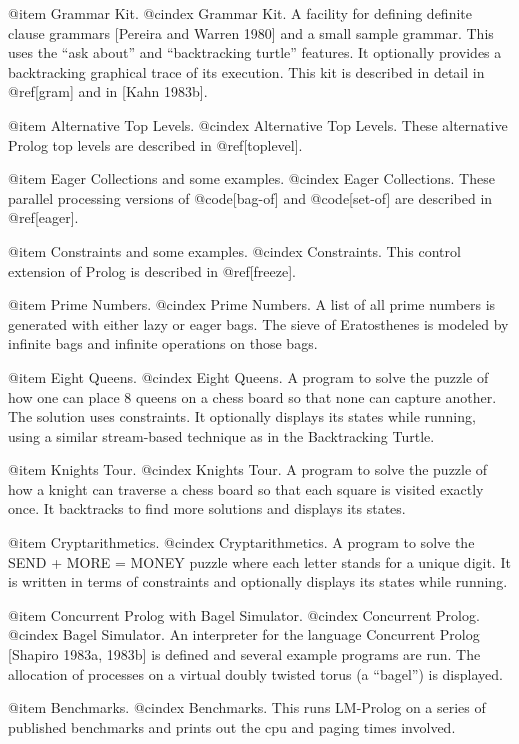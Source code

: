 {@item Grammar Kit.
@cindex Grammar Kit.
A facility for defining definite clause grammars 
[Pereira and Warren 1980]
and a small sample grammar.  This uses the ``ask about'' and
``backtracking turtle'' features.  It optionally provides a backtracking
graphical trace of its execution.  This kit is described in detail in
@ref[gram] and in [Kahn 1983b].

@item Alternative Top Levels.
@cindex Alternative Top Levels.
These alternative Prolog top levels are described in @ref[toplevel].

@item Eager Collections and some examples.
@cindex Eager Collections.
These parallel processing versions of 
@code[bag-of] and @code[set-of] are described in @ref[eager].

@item Constraints and some examples.
@cindex Constraints.
This control extension of Prolog is described 
in @ref[freeze].

@item Prime Numbers.
@cindex Prime Numbers.
A list of all prime numbers is generated with either
lazy or eager bags.  The sieve of Eratosthenes is modeled by infinite
bags and infinite operations on those bags.

@item Eight Queens.
@cindex Eight Queens.
A program to solve the puzzle of how one can place 8 queens on 
a chess board so that none can capture another. The solution uses constraints.
It optionally displays its states while running, using a similar stream-based
technique as in the Backtracking Turtle.

@item Knights Tour.
@cindex Knights Tour.
A program to solve the puzzle of how a knight can traverse a
chess board so that each square is visited exactly once.  It backtracks to
find more solutions and displays its states.

@item Cryptarithmetics.
@cindex Cryptarithmetics.
A program to solve the SEND + MORE = MONEY puzzle
where each letter stands for a unique digit.  It is written in terms of
constraints and optionally displays its states while running.

@item Concurrent Prolog with Bagel Simulator.
@cindex Concurrent Prolog.
@cindex Bagel Simulator.
An interpreter for the language
Concurrent Prolog [Shapiro 1983a, 1983b] is defined and several
example programs are run.
The allocation of processes on a virtual doubly twisted torus (a ``bagel'')
is displayed.

@item Benchmarks.
@cindex Benchmarks.
This runs LM-Prolog on a series of published benchmarks and
prints out the cpu and paging times involved.

}
